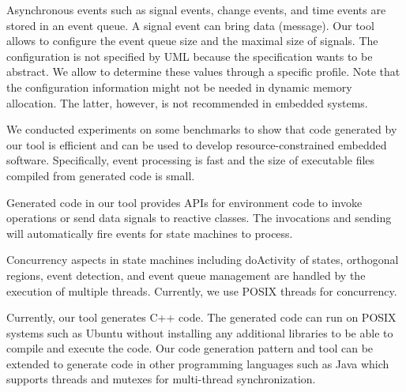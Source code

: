 \vskip 0.1cm
\noindent	
{} 
Asynchronous events such as signal events, change events, and time events are stored in an event queue.
A signal event can bring data (message).
Our tool allows to configure the event queue size and the maximal size of signals.
The configuration is not specified by UML because the specification wants to be abstract.
We allow to determine these values through a specific profile.
Note that the configuration information might not be needed in dynamic memory allocation.
The latter, however, is not recommended in embedded systems.

\vskip 0.1cm
\noindent
{} We conducted experiments on some benchmarks to show that code generated by our tool is efficient and can be used to develop resource-constrained embedded software.
Specifically, event processing is fast and the size of executable files compiled from generated code is small.

\vskip 0.1cm
\noindent
{}
Generated code in our tool provides APIs for environment code to invoke operations or send data signals to reactive classes.
The invocations and sending will automatically fire events for state machines to process.

\vskip 0.1cm
\noindent
{} 
Concurrency aspects in state machines including doActivity of states, orthogonal regions, event detection, and event queue management are handled by the execution of multiple threads.
Currently, we use POSIX threads for concurrency.

\vskip 0.1cm
\noindent
{}
Currently, our tool generates C++ code.
The generated code can run on POSIX systems such as Ubuntu without installing any additional libraries to be able to compile and execute the code.
Our code generation pattern and tool can be extended to generate code in other programming languages such as Java which supports threads and mutexes for multi-thread synchronization.
